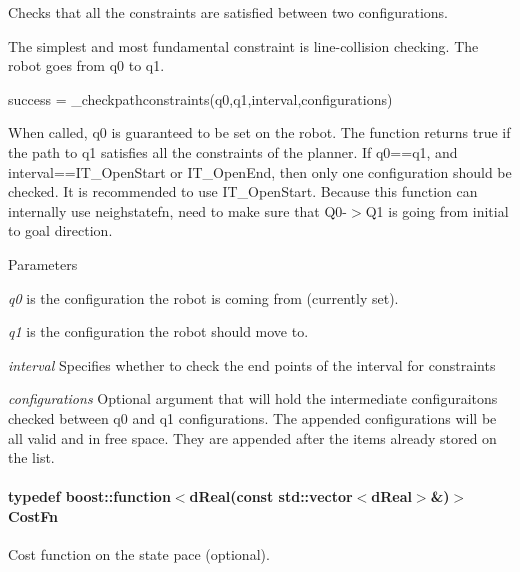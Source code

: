 Checks that all the constraints are satisfied between two configurations. 

The simplest and most fundamental constraint is line-\/collision checking. The robot goes from q0 to q1.

success = \_\-checkpathconstraints(q0,q1,interval,configurations)

When called, q0 is guaranteed to be set on the robot. The function returns true if the path to q1 satisfies all the constraints of the planner. If q0==q1, and interval==IT\_\-OpenStart or IT\_\-OpenEnd, then only one configuration should be checked. It is recommended to use IT\_\-OpenStart. Because this function can internally use neighstatefn, need to make sure that Q0-\/$>$Q1 is going from initial to goal direction.


\begin{DoxyParams}{Parameters}
\item[{\em q0}]is the configuration the robot is coming from (currently set). \item[{\em q1}]is the configuration the robot should move to. \item[{\em interval}]Specifies whether to check the end points of the interval for constraints \item[{\em configurations}]Optional argument that will hold the intermediate configuraitons checked between q0 and q1 configurations. The appended configurations will be all valid and in free space. They are appended after the items already stored on the list. \end{DoxyParams}
\hypertarget{classOpenRAVE_1_1PlannerBase_1_1PlannerParameters_aaa75769bb0c706f4de9f59bc2a43f524}{
\paragraph[{CostFn}]{\setlength{\rightskip}{0pt plus 5cm}typedef boost::function$<$dReal(const std::vector$<$dReal$>$\&)$>$ {\bf CostFn}}\hfill}
\label{classOpenRAVE_1_1PlannerBase_1_1PlannerParameters_aaa75769bb0c706f4de9f59bc2a43f524}


Cost function on the state pace (optional). 

